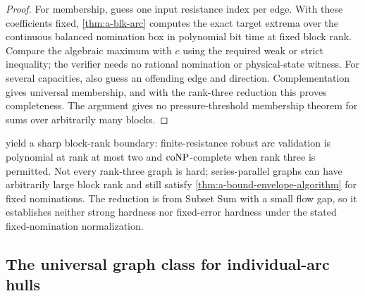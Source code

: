 \begin{proof}
For membership, guess one input resistance index per edge. With these
coefficients fixed, \cref{thm:a-blk-arc} computes the exact target
extrema over the continuous balanced nomination box in polynomial bit
time at fixed block rank. Compare the algebraic maximum with $c$ using
the required weak or strict inequality; the verifier needs no
rational nomination or physical-state witness. For several capacities,
also guess an offending edge and direction. Complementation gives
universal membership, and with the rank-three reduction this proves
completeness. The argument gives no pressure-threshold membership
theorem for sums over arbitrarily many blocks.
\end{proof}

 yield a sharp
block-rank boundary: finite-resistance robust arc validation is polynomial
at rank at most two and $\mathrm{coNP}$-complete when rank three is permitted.
Not every rank-three graph is hard; series-parallel graphs can have
arbitrarily large block rank and still satisfy
\cref{thm:a-bound-envelope-algorithm} for fixed nominations.
The reduction is from Subset Sum with a small flow gap, so it
establishes neither strong hardness nor fixed-error hardness under the
stated fixed-nomination normalization.

\subsection{The universal graph class for individual-arc hulls}
\label{subsec:a-bound-characterization}


